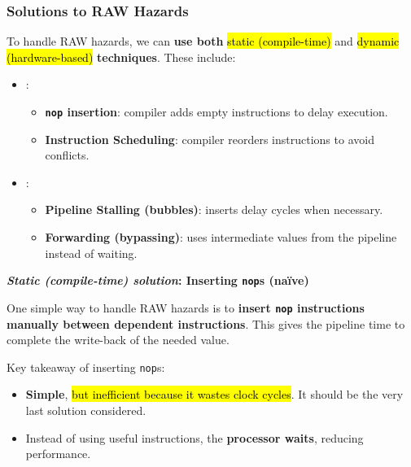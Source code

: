 \subsubsection{Solutions to RAW Hazards}

To handle RAW hazards, we can \textbf{use both} \hl{static (compile-time)} and \hl{dynamic (hardware-based)} \textbf{techniques}. These include:
\begin{itemize}
    \item {}:
    \begin{itemize}[label=\textcolor{Green3}{}]
        \item \textcolor{Green3}{\textbf{\texttt{nop} insertion}}: compiler adds empty instructions to delay execution.
        \item \textcolor{Green3}{\textbf{Instruction Scheduling}}: compiler reorders instructions to avoid conflicts.
    \end{itemize}
    \item {}:
    \begin{itemize}[label=\textcolor{Green3}{}]
        \item \textcolor{Green3}{\textbf{Pipeline Stalling (bubbles)}}: inserts delay cycles when necessary.
        \item \textcolor{Green3}{\textbf{Forwarding (bypassing)}}: uses intermediate values from the pipeline instead of waiting.
    \end{itemize}
\end{itemize}

\highspace
\begin{flushleft}
    \textcolor{Green3}{ \textbf{\emph{Static (compile-time) solution}: Inserting \texttt{nop}s (naïve)}}
\end{flushleft}
One simple way to handle RAW hazards is to \textbf{insert \texttt{nop} instructions manually between dependent instructions}. This gives the pipeline time to complete the write-back of the needed value.

\highspace
Key takeaway of inserting \texttt{nop}s:
\begin{itemize}[label=\textcolor{Red2}{}]
    \item \textbf{Simple}, \hl{but inefficient because it wastes clock cycles}. It should be the very last solution considered.
    
    \item Instead of using useful instructions, the \textbf{processor waits}, reducing performance.
\end{itemize}

